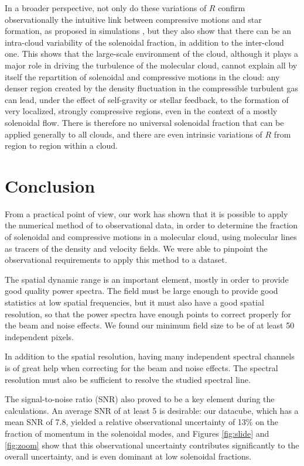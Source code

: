 \documentclass[structabstract]{aa}
\newcommand{\eg}{{\em e.g.,}}
\begin{document}
In a broader perspective, not only do these variations of $R$ confirm observationally the intuitive link between compressive motions and star formation, as proposed in simulations \citep{federrath12,padoan14}, but they also show that there can be an intra-cloud variability of the solenoidal fraction, in addition to the inter-cloud one. This shows that the large-scale environment of the cloud, although it plays a major role in driving the turbulence of the molecular cloud, cannot explain all by itself the repartition of solenoidal and compressive motions in the cloud: any denser region created by the density fluctuation in the compressible turbulent gas \citep[\eg{}][and references therein]{nolan15} can lead, under the effect of self-gravity or stellar feedback, to the formation of very localized, strongly compressive regions, even in the context of a mostly solenoidal flow. There is therefore no universal solenoidal fraction that can be applied generally to all clouds, and there are even intrinsic variations of $R$ from region to region within a cloud.


\section{Conclusion}
From a practical point of view, our work has shown that it is possible to apply the numerical method of \citet{brunt14} to observational data, in order to determine the fraction of solenoidal and compressive motions in a molecular cloud, using molecular lines as tracers of the density and velocity fields. We were able to pinpoint the observational requirements to apply this method to a dataset.

The spatial dynamic range is an important element, mostly in order to provide good quality power spectra. The field must be large enough to provide good statistics at low spatial frequencies, but it must also have a good spatial resolution, so that the power spectra have enough points to correct properly for the beam and noise effects. We found our minimum field size to be of at least 50 independent pixels.

In addition to the spatial resolution, having many independent spectral channels is of great help when correcting for the beam and noise effects. The spectral resolution must also be sufficient to resolve the studied spectral line.

The signal-to-noise ratio (SNR) also proved to be a key element during the calculations. An average SNR of at least 5 is desirable: our datacube, which has a mean SNR of 7.8, yielded a relative observational uncertainty of 13\% on the fraction of momentum in the solenoidal modes, and Figures \ref{fig:slide} and \ref{fig:zoom} show that this observational uncertainty contributes significantly to the overall uncertainty, and is even dominant at low solenoidal fractions.
\end{document}
